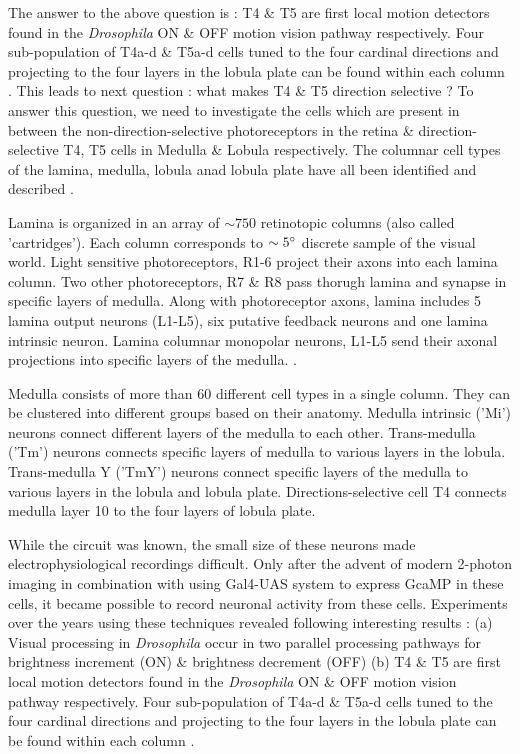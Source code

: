The answer to the above question is : T4 \& T5 are first local motion detectors found in the \textit{Drosophila} ON \& OFF motion vision pathway respectively. Four sub-population of T4a-d \& T5a-d cells tuned to the four cardinal directions and projecting to the four layers in the lobula plate can be found within each column \parencite{Maisak2013}. This leads to next question : what makes T4 \& T5 direction selective ? To answer this question, we need to investigate the cells which are present in between the non-direction-selective photoreceptors in the retina \& direction-selective T4, T5 cells in Medulla \& Lobula respectively. The columnar cell types of the lamina, medulla, lobula anad lobula plate have all been identified and described \parencite{Fischbach1989, RamonyCajal1915}.  

Lamina is organized in an array of $\sim 750$ retinotopic columns (also called 'cartridges'). Each column corresponds to $\sim 5\degree$ discrete sample of the visual world. Light sensitive photoreceptors, R1-6 project their axons into each lamina column. Two other photoreceptors, R7 \& R8 pass thorugh lamina and synapse in specific layers of medulla. Along with photoreceptor axons, lamina includes 5 lamina output neurons (L1-L5), six putative feedback neurons and one lamina intrinsic neuron. Lamina columnar monopolar neurons, L1-L5 send their axonal projections into specific layers of the medulla. \parencite{Fischbach1989, Tuthill2013}. 

Medulla consists of more than 60 different cell types in a single column. They can be clustered into different groups based on their anatomy. Medulla intrinsic ('Mi') neurons connect different layers of the medulla to each other. Trans-medulla ('Tm') neurons connects specific layers of medulla to various layers in the lobula. Trans-medulla Y ('TmY') neurons connect specific layers of the medulla to various layers in the lobula and lobula plate. Directions-selective cell T4 connects medulla layer 10 to the four layers of lobula plate.

While the circuit was known, the small size of these neurons made electrophysiological recordings difficult. Only after the advent of modern 2-photon imaging in combination with using Gal4-UAS system to express GcaMP in these cells, it became possible to record neuronal activity from these cells. Experiments over the years using these techniques revealed following interesting results : (a) Visual processing in \textit{Drosophila} occur in two parallel processing pathways for brightness increment (ON) \& brightness decrement (OFF) \parencite{Joesch2010, Joesch2013, Strother2014, Eichner2011, Behnia2014} (b) T4 \& T5 are first local motion detectors found in the \textit{Drosophila} ON \& OFF motion vision pathway respectively. Four sub-population of T4a-d \& T5a-d cells tuned to the four cardinal directions and projecting to the four layers in the lobula plate can be found within each column \parencite{Maisak2013}. 
 
